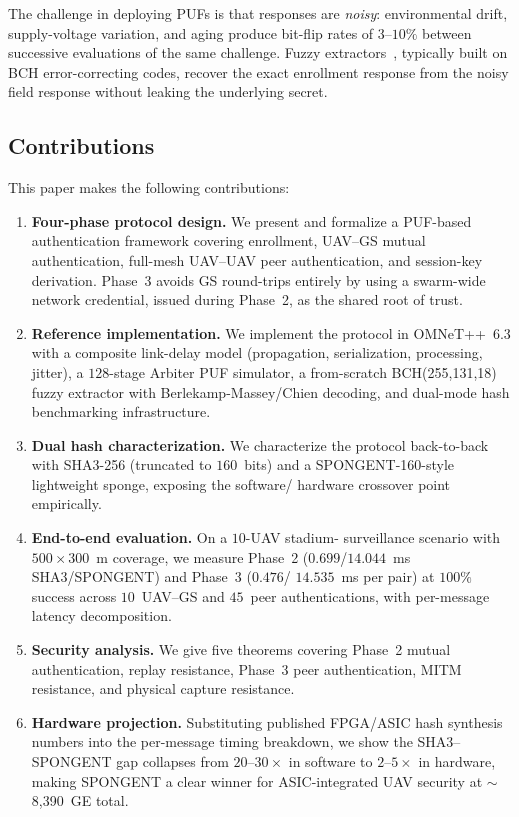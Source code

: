 \documentclass[journal,a4paper,10pt]{IEEEtran}
\begin{document}
The challenge in deploying PUFs is that responses are \emph{noisy}:
environmental drift, supply-voltage variation, and aging produce
bit-flip rates of $3$--$10\%$ between successive evaluations of the
same challenge. Fuzzy extractors~\cite{bch_puf_extraction,
helper_data_masking}, typically built on BCH error-correcting codes,
recover the exact enrollment response from the noisy field response
without leaking the underlying secret.

\subsection*{Contributions}
This paper makes the following contributions:
\begin{enumerate}[leftmargin=*]
\item \textbf{Four-phase protocol design.} We present and formalize a
  PUF-based authentication framework covering enrollment, UAV--GS
  mutual authentication, full-mesh UAV--UAV peer authentication, and
  session-key derivation. Phase~3 avoids GS round-trips entirely by
  using a swarm-wide network credential, issued during Phase~2, as the
  shared root of trust.
\item \textbf{Reference implementation.} We implement the protocol in
  OMNeT++~6.3 with a composite link-delay model (propagation,
  serialization, processing, jitter), a $128$-stage Arbiter PUF
  simulator, a from-scratch BCH(255,131,18) fuzzy extractor with
  Berlekamp-Massey/Chien decoding, and dual-mode hash benchmarking
  infrastructure.
\item \textbf{Dual hash characterization.} We characterize the
  protocol back-to-back with SHA3-256 (truncated to $160$~bits) and a
  SPONGENT-160-style lightweight sponge, exposing the software/
  hardware crossover point empirically.
\item \textbf{End-to-end evaluation.} On a $10$-UAV stadium-
  surveillance scenario with $500{\times}300$~m coverage, we measure
  Phase~2 ($0.699$/$14.044$~ms SHA3/SPONGENT) and Phase~3 ($0.476$/
  $14.535$~ms per pair) at $100\%$ success across $10$~UAV--GS and
  $45$~peer authentications, with per-message latency decomposition.
\item \textbf{Security analysis.} We give five theorems covering
  Phase~2 mutual authentication, replay resistance, Phase~3 peer
  authentication, MITM resistance, and physical capture resistance.
\item \textbf{Hardware projection.} Substituting published FPGA/ASIC
  hash synthesis numbers into the per-message timing breakdown, we
  show the SHA3--SPONGENT gap collapses from $20$--$30\times$ in software
  to $2$--$5\times$ in hardware, making SPONGENT a clear winner for
  ASIC-integrated UAV security at $\sim$8{,}390~GE total.
\end{enumerate}
\end{document}
